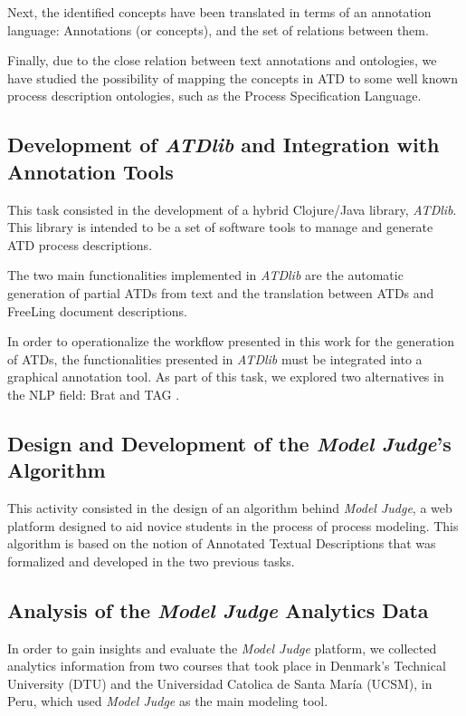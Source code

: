 Next, the identified concepts have been translated in terms of an annotation
language: Annotations (or concepts), and the set of relations between them. 

Finally, due to the close relation between text annotations and ontologies, we
have studied the possibility of mapping the concepts in ATD to some well known
process description ontologies, such as the Process Specification
Language\cite{gruninger2003process}.

\subsection*{Development of \emph{ATDlib} and Integration with Annotation Tools}

This task consisted in the development of a hybrid Clojure/Java library, \emph{ATDlib}.
This library is intended to be a set of software tools to manage and generate
ATD process descriptions.

The two main functionalities implemented in \emph{ATDlib} are the automatic
generation of partial ATDs from text and the translation between ATDs and
FreeLing\cite{PadroS12} document descriptions.

In order to operationalize the workflow presented in this work for the
generation of ATDs, the functionalities presented in \emph{ATDlib} must be
integrated into a graphical annotation tool. As part of this task, we explored
two alternatives in the NLP field: Brat\cite{stenetorp2012brat} and TAG
\cite{DBLP:journals/corr/abs-1711-00529}.

\subsection*{Design and Development of the \emph{Model Judge}'s Algorithm}

This activity consisted in the design of an algorithm behind \emph{Model Judge},
a web platform designed to aid novice students in the process of process
modeling. This algorithm is based on the notion of Annotated Textual
Descriptions that was formalized and developed in the two previous tasks.

\subsection*{Analysis of the \emph{Model Judge} Analytics Data}

In order to gain insights and evaluate the \emph{Model Judge} platform, we
collected analytics information from two courses that took place in
Denmark's Technical University (DTU) and the Universidad Catolica de Santa
Mar\'ia (UCSM), in Peru, which used \emph{Model Judge} as the main
modeling tool.

